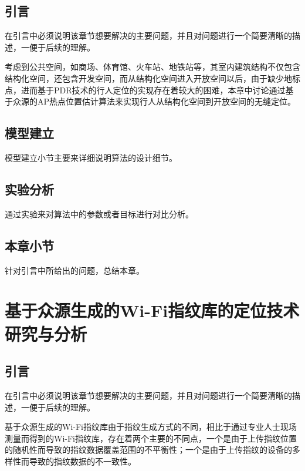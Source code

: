 \section{引言}

在引言中必须说明该章节想要解决的主要问题，并且对问题进行一个简要清晰的描述，一便于后续的理解。

考虑到公共空间，如商场、体育馆、火车站、地铁站等，其室内建筑结构不仅包含结构化空间，还包含开发空间，而从结构化空间进入开放空间以后，由于缺少地标点，进而基于PDR技术的行人定位的实现存在着较大的困难，本章中讨论通过基于众源的AP热点位置估计算法来实现行人从结构化空间到开放空间的无缝定位。

\section{模型建立}

模型建立小节主要来详细说明算法的设计细节。

\section{实验分析}

通过实验来对算法中的参数或者目标进行对比分析。

\section{本章小节}

针对引言中所给出的问题，总结本章。




\chapter{基于众源生成的Wi-Fi指纹库的定位技术研究与分析}

\section{引言}

在引言中必须说明该章节想要解决的主要问题，并且对问题进行一个简要清晰的描述，一便于后续的理解\cite{montoliu2017indoorloc}。

基于众源生成的Wi-Fi指纹库由于指纹生成方式的不同，相比于通过专业人士现场测量而得到的Wi-Fi指纹库，存在着两个主要的不同点，一个是由于上传指纹位置的随机性而导致的指纹数据覆盖范围的不平衡性；一个是由于上传指纹的设备的多样性而导致的指纹数据的不一致性。

